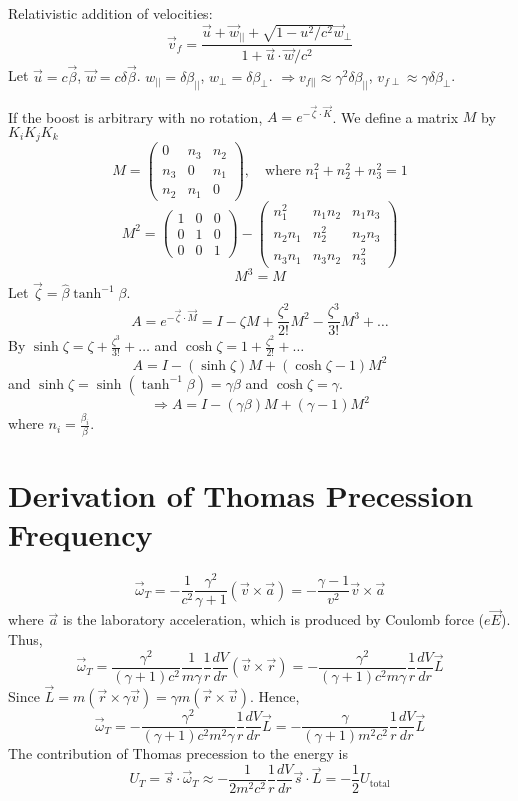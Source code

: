 \documentclass{article}
\begin{document}
	Relativistic addition of velocities:
	\[ \vec{v}_f = \frac{\vec{u} + \vec{w}_{||} + \sqrt{1-u^2/c^2}\vec{w}_{\perp}}{1 + \vec{u}\cdot\vec{w}/c^2} \]
	Let $\vec{u} = c\vec{\beta}$, $\vec{w} = c\delta\vec{\beta}$.
	$w_{||} = \delta\beta_{||}$, $w_{\perp} = \delta\beta_{\perp}$.
	$\Rightarrow v_{f||} \approx \gamma^2 \delta\beta_{||}$, $v_{f\perp} \approx \gamma \delta\beta_{\perp}$.
	
	\pagebreak
	
	If the boost is arbitrary with no rotation, $A = e^{-\vec{\zeta} \cdot \vec{K}}$.
	We define a matrix $M$ by $K_i K_j K_k$
	\[ M = \begin{pmatrix} 0 & n_3 & n_2 \\ n_3 & 0 & n_1 \\ n_2 & n_1 & 0 \end{pmatrix}, \quad \text{where } n_1^2+n_2^2+n_3^2=1 \]
	\[ M^2 = \begin{pmatrix} 1 & 0 & 0 \\ 0 & 1 & 0 \\ 0 & 0 & 1 \end{pmatrix} - \begin{pmatrix} n_1^2 & n_1n_2 & n_1n_3 \\ n_2n_1 & n_2^2 & n_2n_3 \\ n_3n_1 & n_3n_2 & n_3^2 \end{pmatrix} \]
	\[ M^3 = M \]
	Let $\vec{\zeta} = \hat{\beta} \tanh^{-1}\beta$.
	\[ A = e^{-\vec{\zeta} \cdot \vec{M}} = I - \zeta M + \frac{\zeta^2}{2!} M^2 - \frac{\zeta^3}{3!} M^3 + \dots \]
	By $\sinh\zeta = \zeta + \frac{\zeta^3}{3!} + \dots$ and $\cosh\zeta = 1 + \frac{\zeta^2}{2!} + \dots$
	\[ A = I - (\sinh\zeta) M + (\cosh\zeta - 1) M^2 \]
	and $\sinh\zeta = \sinh(\tanh^{-1}\beta) = \gamma\beta$ and $\cosh\zeta = \gamma$.
	\[ \Rightarrow A = I - (\gamma\beta) M + (\gamma-1) M^2 \]
	where $n_i = \frac{\beta_i}{\beta}$.
	
	\section{Derivation of Thomas Precession Frequency}
	\[ \vec{\omega}_T = -\frac{1}{c^2} \frac{\gamma^2}{\gamma+1} (\vec{v} \times \vec{a}) = -\frac{\gamma-1}{v^2} \vec{v} \times \vec{a} \]
	where $\vec{a}$ is the laboratory acceleration, which is produced by Coulomb force ($e\vec{E}$).
	Thus,
	\[ \vec{\omega}_T = \frac{\gamma^2}{(\gamma+1)c^2} \frac{1}{m\gamma} \frac{1}{r} \frac{dV}{dr} (\vec{v} \times \vec{r}) = -\frac{\gamma^2}{(\gamma+1)c^2 m\gamma} \frac{1}{r} \frac{dV}{dr} \vec{L} \]
	Since $\vec{L} = m(\vec{r} \times \gamma\vec{v}) = \gamma m(\vec{r} \times \vec{v})$.
	Hence,
	\[ \vec{\omega}_T = -\frac{\gamma^2}{(\gamma+1)c^2 m^2\gamma} \frac{1}{r} \frac{dV}{dr} \vec{L} = -\frac{\gamma}{(\gamma+1)m^2c^2} \frac{1}{r} \frac{dV}{dr} \vec{L} \]
	The contribution of Thomas precession to the energy is
	\[ U_T = \vec{s} \cdot \vec{\omega}_T \approx -\frac{1}{2m^2c^2} \frac{1}{r} \frac{dV}{dr} \vec{s} \cdot \vec{L} = -\frac{1}{2}U_{\text{total}} \]
	
\end{document}
